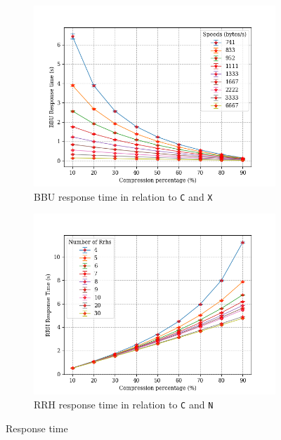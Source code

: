 \documentclass[11pt,a4paper,oneside, openright]{article}
\begin{document}
\begin{figure}[H]
  \centering
  \begin{subfigure}{.5\textwidth}
  	\centering
  	\includegraphics[width=\linewidth]{images/c-vs-response-time-bbu}
  	\caption{BBU response time in relation to \texttt{C} and \texttt{X}}
  	\label{fig:c-vs-response-time-bbu}
  \end{subfigure}%
  \begin{subfigure}{.5\textwidth}
    \centering
    \includegraphics[width=\linewidth]{images/c-vs-response-time-rrh}
    \caption{RRH response time in relation to \texttt{C} and \texttt{N}}
    \label{fig:c-vs-response-time-rrh}
  \end{subfigure}
  \caption{Response time}
  \label{fig:response-time}
\end{figure}
\end{document}
